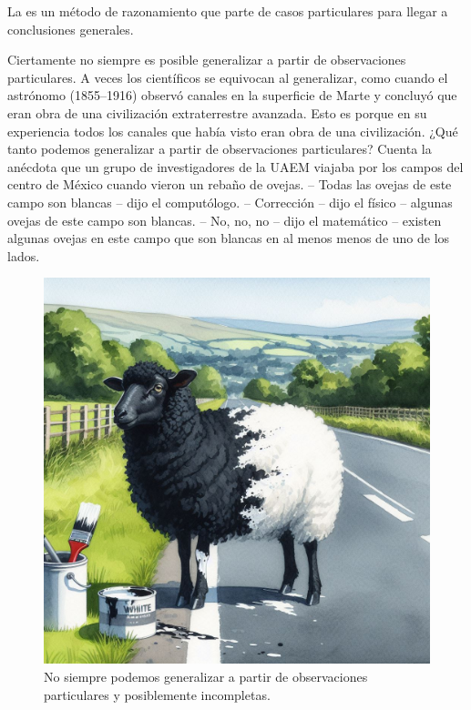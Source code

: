 \begin{remember}
    \label{rem:induccion}
    La  es un método de razonamiento que parte de casos
    particulares para llegar a conclusiones generales.
\end{remember}

Ciertamente no siempre es posible generalizar a partir de observaciones
particulares.
A veces los científicos se equivocan al generalizar, como cuando el astrónomo
 (1855--1916) observó canales en la
superficie de Marte y concluyó que eran obra de una civilización extraterrestre
avanzada.
Esto es porque en su experiencia todos los canales que había visto eran obra de
una civilización.
¿Qué tanto podemos generalizar a partir de observaciones particulares?
Cuenta la anécdota que un grupo de investigadores de la UAEM viajaba por los
campos del centro de México cuando vieron un rebaño de ovejas.
-- Todas las ovejas de este campo son blancas -- dijo el computólogo.
-- Corrección -- dijo el físico -- algunas ovejas de este campo son blancas.
-- No, no, no -- dijo el matemático -- existen algunas ovejas en este campo que
son blancas en al menos menos de uno de los lados.

\begin{figure}[ht]
    \centering
    \includegraphics[width=0.8\linewidth]{img/oveja}
    \caption{No siempre podemos generalizar a partir de observaciones
        particulares y posiblemente incompletas.}
\end{figure}

